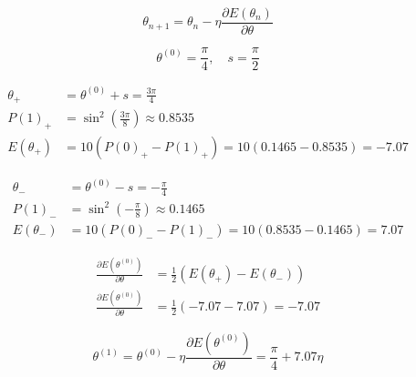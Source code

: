 \begin{equation}
    \theta_{n+1} = \theta_n - \eta \frac{\partial E(\theta_n)}{\partial \theta}
\end{equation}

\begin{equation}
    \theta^{(0)} = \frac{\pi}{4}, \quad s = \frac{\pi}{2}
\end{equation}

\begin{align}
    \theta_+ &= \theta^{(0)} + s = \frac{3\pi}{4} \\
    P(1)_+ &= \sin^2\left(\frac{3\pi}{8}\right) \approx 0.8535 \\
    E(\theta_+) &= 10(P(0)_+ - P(1)_+) = 10(0.1465 - 0.8535) = -7.07
\end{align}

\begin{align}
    \theta_- &= \theta^{(0)} - s = -\frac{\pi}{4} \\
    P(1)_- &= \sin^2\left(-\frac{\pi}{8}\right) \approx 0.1465 \\
    E(\theta_-) &= 10(P(0)_- - P(1)_-) = 10(0.8535 - 0.1465) = 7.07
\end{align}

\begin{align}
    \frac{\partial E(\theta^{(0)})}{\partial \theta} &= \frac{1}{2} (E(\theta_+) - E(\theta_-)) \\
    \frac{\partial E(\theta^{(0)})}{\partial \theta} &= \frac{1}{2} (-7.07 - 7.07) = -7.07
\end{align}

\begin{equation}
    \theta^{(1)} = \theta^{(0)} - \eta \frac{\partial E(\theta^{(0)})}{\partial \theta} = \frac{\pi}{4} + 7.07 \eta
\end{equation}
